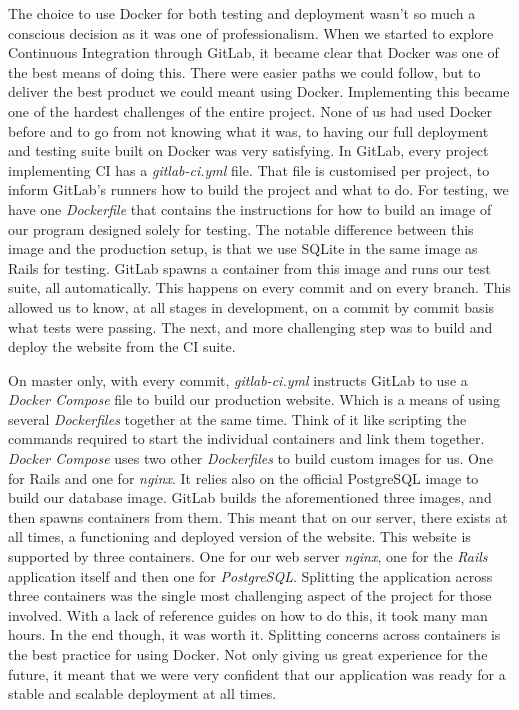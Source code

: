 \documentclass{l3proj}
\begin{document}
The choice to use Docker for both testing and deployment wasn't so much a conscious decision as it was one of professionalism. When we started to explore Continuous Integration through GitLab, it became clear that Docker was one of the best means of doing this. There were easier paths we could follow, but to deliver the best product we could meant using Docker. Implementing this became one of the hardest challenges of the entire project. None of us had used Docker before and to go from not knowing what it was, to having our full deployment and testing suite built on Docker was very satisfying. In GitLab, every project implementing CI has a \textit{gitlab-ci.yml} file. That file is customised per project, to inform GitLab's runners how to build the project and what to do. For testing, we have one \textit{Dockerfile} that contains the instructions for how to build an image of our program designed solely for testing. The notable difference between this image and the production setup, is that we use SQLite in the same image as Rails for testing. GitLab spawns a container from this image and runs our test suite, all automatically. This happens on every commit and on every branch. This allowed us to know, at all stages in development, on a commit by commit basis what tests were passing. The next, and more challenging step was to build and deploy the website from the CI suite.

On master only, with every commit, \textit{gitlab-ci.yml} instructs GitLab to use a \textit{Docker Compose} file to build our production website. Which is a means of using several \textit{Dockerfiles} together at the same time. Think of it like scripting the commands required to start the individual containers and link them together. \textit{Docker Compose} uses two other \textit{Dockerfiles} to build custom images for us. One for Rails and one for \textit{nginx}. It relies also on the official PostgreSQL image to build our database image. GitLab builds the aforementioned three images, and then spawns containers from them. This meant that on our server, there exists at all times, a functioning and deployed version of the website. This website is supported by three containers. One for our web server \textit{nginx}, one for the \textit{Rails} application itself and then one for \textit{PostgreSQL}. Splitting the application across three containers was the single most challenging aspect of the project for those involved. With a lack of reference guides on how to do this, it took many man hours. In the end though, it was worth it. Splitting concerns across containers is the best practice for using Docker. Not only giving us great experience for the future, it meant that we were very confident that our application was ready for a stable and scalable deployment at all times.
\end{document}
